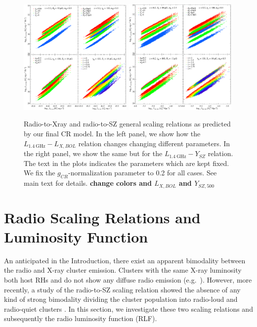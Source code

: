 \documentclass[traditabstract]{aa}
\newcommand{\rmn}{\mathrm}
\begin{document}
\begin{figure}[hbt!]
\centering
\includegraphics[width=0.49\textwidth]{figures/PL_relation_testing_gimp.eps}
\includegraphics[width=0.49\textwidth]{figures/PSZ_relation_testing_gimp.eps}
\caption{Radio-to-Xray and radio-to-SZ general scaling relations as predicted by our final CR model. In the left panel, we show how the $L_{1.4~\rmn{GHz}}-L_{X, BOL}$ relation changes changing different parameters. In the right panel, we show the same but for the $L_{1.4~\rmn{GHz}}-Y_{SZ}$ relation. The text in the plots indicates the parameters which are kept fixed. We fix the $g_{CR}$-normalization parameter to 0.2 for all cases. See main text for details. {\bf change colors and $L_{X, BOL}$ and $Y_{SZ, 500}$}}
\label{fig:SR}
\end{figure}

\section{Radio Scaling Relations and Luminosity Function}
\label{sec:4}
An anticipated in the Introduction, there exist an apparent bimodality between the radio and X-ray cluster emission. Clusters with the same X-ray luminosity both host RHs and do not show any diffuse radio emission (e.g.~\citealp{2009A&A...507..661B,2011A&A...527A..99E}). However, more recently, a study of the radio-to-SZ scaling relation showed the absence of any kind of strong bimodality dividing the cluster population into radio-loud and radio-quiet clusters \citep{2012MNRAS.421L.112B}. In this section, we investigate these two scaling relations and subsequently the radio luminosity function (RLF).
\end{document}
